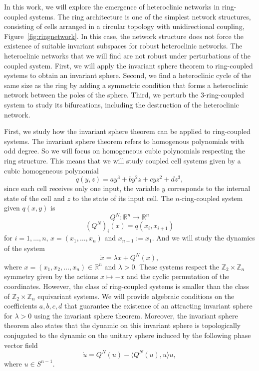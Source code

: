 \documentclass{article}
\theoremstyle{definition}
\begin{document}
In this work, we will explore the emergence of heteroclinic networks in ring-coupled systems.
The ring architecture is one of the simplest network structures, consisting of cells arranged in a circular topology with unidirectional coupling, Figure~\ref{fig:ringnetwork}.
In this case, the network structure does not force the existence of suitable invariant subspaces for robust heteroclinic networks. The heteroclinic networks that we will find are not robust under perturbations of the coupled system.
First, we will apply the invariant sphere theorem to ring-coupled systems to obtain an invariant sphere.
Second, we find a heteroclinic cycle of the same size as the ring by adding a symmetric condition that forms a heteroclinic network between the poles of the sphere.
Third, we perturb the $3$-ring-coupled system to study its bifurcations, including the destruction of the heteroclinic network.



First, we study how the invariant sphere theorem can be applied to ring-coupled systems.
The invariant sphere theorem refers to homogenous polynomials with odd degree.
So we will focus on homogeneous cubic polynomials respecting the ring structure.
This means that we will study coupled cell systems given by a cubic homogeneous polynomial
$$q(y,z)=a y^3+b y^2 z + c y z^2+d z^3,$$ since each cell receives only one input, the variable $y$ corresponds to the internal state of the cell and $z$ to the state of its input cell. 
The $n$-ring-coupled system given $q(x,y)$ is 
$$Q^N:\mathbb{R}^n\rightarrow \mathbb{R}^n$$
$$(Q^N)_i(x)=q(x_{i},x_{i+1})$$
for $i=1,\dots,n$, $x=(x_1,\dots,x_n)$ and $x_{n+1}:=x_1$.
And we will study the dynamics of the system
\begin{equation}\label{eq:edoring}
\dot{x}=\lambda x + Q^N(x),
\end{equation}
where $x=(x_1,x_2,\dots,x_n)\in\mathbb{R}^n$ and $\lambda>0$. 
These systems respect the $\mathbb{Z}_2\times\mathbb{Z}_n$ symmetry given by the actions $x\mapsto -x$ and the cyclic permutation of the coordinates. 
However, the class of ring-coupled systems is smaller than the class of $\mathbb{Z}_2\times\mathbb{Z}_n$ equivariant systems.
We will provide algebraic conditions on the coefficients $a,b,c,d$ that guarantee the existence of an attracting invariant sphere for $\lambda>0$ using the invariant sphere theorem.
Moreover, the invariant sphere theorem also states that the dynamic on this invariant sphere is topologically conjugated to the  dynamic on the unitary sphere induced by the following phase vector field $$\dot{u}= Q^N(u)-\langle Q^N(u),u\rangle u,$$
where $u\in S^{n-1}$. 
\end{document}
